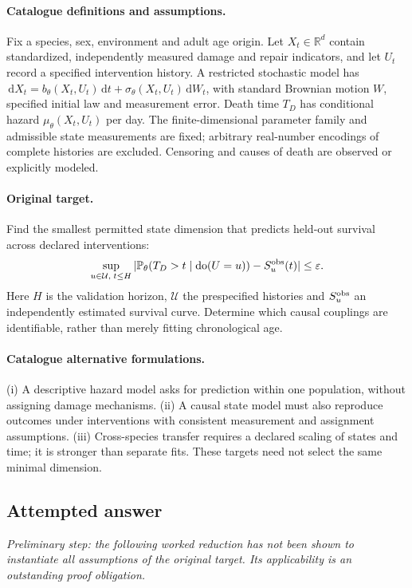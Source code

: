 \documentclass[11pt]{article}
\begin{document}
\paragraph{Catalogue definitions and assumptions.}
Fix a species, sex, environment and adult age origin. Let $X_t\in\mathbb{R}^d$ contain standardized, independently measured damage and repair indicators, and let $U_t$ record a specified intervention history. A restricted stochastic model has $\,\mathrm{d} X_t=b_\theta(X_t,U_t)\,\mathrm{d} t+\sigma_\theta(X_t,U_t)\,\mathrm{d} W_t$, with standard Brownian motion $W$, specified initial law and measurement error. Death time $T_D$ has conditional hazard $\mu_\theta(X_t,U_t)$ per day. The finite-dimensional parameter family and admissible state measurements are fixed; arbitrary real-number encodings of complete histories are excluded. Censoring and causes of death are observed or explicitly modeled.
\paragraph{Original target.}
Find the smallest permitted state dimension that predicts held-out survival across declared interventions:
    \[\sup_{u\in\mathcal U,\;t\leq H}
    |\mathbb{P}_\theta(T_D>t\mid\operatorname{do}(U=u))-S^{\rm obs}_u(t)|\leq\varepsilon.\]
    Here $H$ is the validation horizon, $\mathcal U$ the prespecified histories and $S^{\rm obs}_u$ an independently estimated survival curve. Determine which causal couplings are identifiable, rather than merely fitting chronological age.
\paragraph{Catalogue alternative formulations.}
(i) A descriptive hazard model asks for prediction within one population, without assigning damage mechanisms. (ii) A causal state model must also reproduce outcomes under interventions with consistent measurement and assignment assumptions. (iii) Cross-species transfer requires a declared scaling of states and time; it is stronger than separate fits. These targets need not select the same minimal dimension.
\subsection{Attempted answer}
\noindent\emph{Preliminary step: the following worked reduction has not been shown to instantiate all assumptions of the original target. Its applicability is an outstanding proof obligation.}
\end{document}
